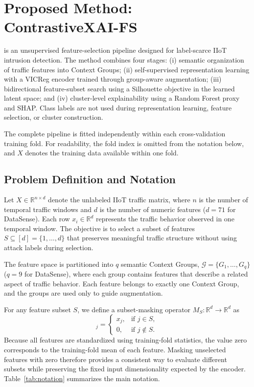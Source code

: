 \section{Proposed Method: ContrastiveXAI-FS}
\label{sec:method}

\method{} is an unsupervised feature-selection pipeline designed for label-scarce IIoT intrusion detection. The method combines four stages: (i) semantic organization of traffic features into Context Groups; (ii) self-supervised representation learning with a VICReg encoder trained through group-aware augmentation; (iii) bidirectional feature-subset search using a Silhouette objective in the learned latent space; and (iv) cluster-level explainability using a Random Forest proxy and SHAP. Class labels are not used during representation learning, feature selection, or cluster construction.

The complete pipeline is fitted independently within each cross-validation training fold. For readability, the fold index is omitted from the notation below, and $X$ denotes the training data available within one fold.

\subsection{Problem Definition and Notation}

Let $X \in \mathbb{R}^{n \times d}$ denote the unlabeled IIoT traffic matrix, where $n$ is the number of temporal traffic windows and $d$ is the number of numeric features ($d = 71$ for DataSense). Each row $x_i \in \mathbb{R}^{d}$ represents the traffic behavior observed in one temporal window. The objective is to select a subset of features $S \subseteq [d] = \{1,\dots,d\}$ that preserves meaningful traffic structure without using attack labels during selection.

The feature space is partitioned into $q$ semantic Context Groups, $\mathcal{G} = \{G_1,\dots,G_q\}$ ($q = 9$ for DataSense), where each group contains features that describe a related aspect of traffic behavior. Each feature belongs to exactly one Context Group, and the groups are used only to guide augmentation.

For any feature subset $S$, we define a subset-masking operator $M_S : \mathbb{R}^{d} \rightarrow \mathbb{R}^{d}$ as
\begin{equation}
[M_S(x)]_j =
\begin{cases}
x_j, & \text{if } j \in S,\\
0, & \text{if } j \notin S.
\end{cases}
\label{eq:mask}
\end{equation}
Because all features are standardized using training-fold statistics, the value zero corresponds to the training-fold mean of each feature. Masking unselected features with zero therefore provides a consistent way to evaluate different subsets while preserving the fixed input dimensionality expected by the encoder. Table~\ref{tab:notation} summarizes the main notation.

